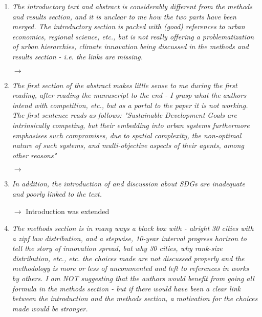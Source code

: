 \documentclass[10pt,a4paper,sans]{moderncv}        %
\begin{document}
\begin{enumerate}
%       
    \item \textit{The introductory text and abstract is considerably different from the methods and results section, and it is unclear to me how the two parts have been merged. The introductory section is packed with (good) references to urban economics, regional science, etc., but is not really offering a problematization of urban hierarchies, climate innovation being discussed in the methods and results section - i.e. the links are missing.}
    
    \medskip

    $\rightarrow$

    \bigskip

    \item \textit{The first section of the abstract makes little sense to me during the first reading, after reading the manuscript to the end - I grasp what the authors intend with competition, etc., but as a portal to the paper it is not working. The first sentence reads as follows: "Sustainable Development Goals are intrinsically competing, but their embedding into urban systems furthermore emphasises such compromises, due to spatial complexity, the non-optimal nature of such systems, and multi-objective aspects of their agents, among other reasons"}
    
    \medskip
    
    $\rightarrow$
    
    \bigskip

    \item \textit{In addition, the introduction of and discussion about SDGs are inadequate and poorly linked to the text.}

    \medskip
    
    $\rightarrow$ Introduction was extended
    
    \bigskip

    \item \textit{The methods section is in many ways a black box with - alright 30 cities with a zipf law distribution, and a stepwise, 10-year interval progress horizon to tell the story of innovation spread, but why 30 cities, why rank-size distribution, etc., etc. the choices made are not discussed properly and the methodology is more or less of uncommented and left to references in works by others. I am NOT suggesting that the authors would benefit from going all formula in the methods section - but if there would have been a clear link between the introduction and the methods section, a motivation for the choices made would be stronger.}
    

\end{enumerate}
\end{document}

